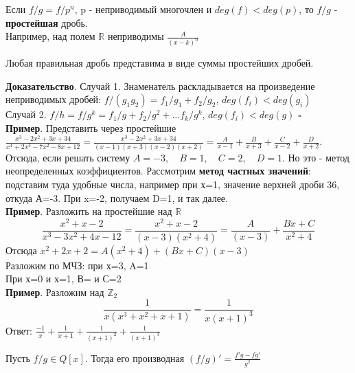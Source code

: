 Если $f/g=f/p^n$, p - неприводимый многочлен и $deg(f)<deg(p)$, то $f/g$ - 
\textbf{простейшая} дробь.\\
Например, над полем $\mathbb R$ неприводимы $\frac{A}{(x-k)^n}$
\begin{theor}
Любая правильная дробь представима в виде суммы простейших дробей.
\end{theor}
\textbf{Доказательство}.
Случай 1. Знаменатель раскладывается на произведение неприводимых дробей:
$f/(g_1g_2)=f_1/g_1+f_2/g_2$, $deg(f_i)<deg(g_i)$\\
Случай 2. $f/h=f/g^k=f_1/g+f_2/g^2+...f_k/g^k$, $deg(f_i)<deg(g)$ $\square$\\

\textbf{Пример}. Представить через простейшие 
$\frac{x^3-2x^2+3x+34}{x^4+2x^3-7x^2-8x+12}=\frac{x^3-2x^2+3x+34}{(x-1)
(x+3)(x-2)(x+2)}
=\frac{A}{x-1}+\frac{B}{x+3}+\frac{C}{x-2}+\frac{D}{x+2}$. 
Отсюда, если решать систему $A=-3,\quad B=1,\quad C=2,\quad D=1$. 
Но это - метод неопределенных коэффициентов. Рассмотрим 
\textbf{метод частных значений}: подставим туда удобные числа, например при х=1,
значение верхней дроби 36, откуда А=-3. При x=-2, получаем D=1, и так далее. \\
\textbf{Пример}. Разложить на простейшие над $\mathbb R$
$$\frac{x^2+x-2}{x^3-3x^2+4x-12}=\frac{x^2+x-2}{(x-3)(x^2+4)}=\frac{A}{(x-3)}+
\frac{Bx+C}{x^2+4}$$
Отсюда $x^2+2x+2=A(x^2+4)+(Bx+C)(x-3)$\\
Разложим по МЧЗ: при х=3, A=1\\
При х=0 и х=1, В= и С=2\\
\textbf{Пример}. Разложим над $\mathbb Z_2$
$$\frac{1}{x(x^3+x^2+x+1)}=\frac{1}{x(x+1)^3}$$
Ответ: $\frac{-1}{x}+\frac{1}{x+1}+\frac{1}{(x+1)^2}+\frac{1}{(x+1)^3}$\\
\begin{defin}
Пусть $f/g\in Q[x]$. Тогда его производная $(f/g)'=\frac{f'g-fg'}{g^2}$
\end{defin}


